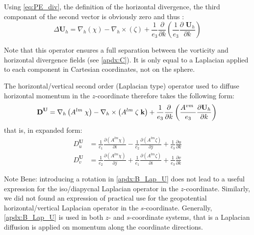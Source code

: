 \documentclass[../main/NEMO_manual]{subfiles}
\begin{document}
Using \autoref{eq:PE_div}, the definition of the horizontal divergence,
the third componant of the second vector is obviously zero and thus :
\[
  \Delta {\textbf{U}}_h = \nabla _h \left( \chi \right) - \nabla _h \times \left( \zeta \right) + \frac {1}{e_3 } \frac {\partial }{\partial k} \left( {\frac {1}{e_3 } \frac{\partial {\textbf{ U}}_h }{\partial k}} \right)
\]

Note that this operator ensures a full separation between
the vorticity and horizontal divergence fields (see \autoref{apdx:C}).
It is only equal to a Laplacian applied to each component in Cartesian coordinates, not on the sphere.

The horizontal/vertical second order (Laplacian type) operator used to diffuse horizontal momentum in
the $z$-coordinate therefore takes the following form:
\begin{equation}
  \label{apdx:B_Lap_U}
  {
    \textbf{D}}^{\textbf{U}} =
  \nabla _h \left( {A^{lm}\;\chi } \right)
  - \nabla _h \times \left( {A^{lm}\;\zeta \;{\textbf{k}}} \right)
  + \frac{1}{e_3 }\frac{\partial }{\partial k}\left( {\frac{A^{vm}\;}{e_3 }
      \frac{\partial {\rm {\bf U}}_h }{\partial k}} \right) \\
\end{equation}
that is, in expanded form:
\begin{align*}
  D^{\textbf{U}}_u
  & = \frac{1}{e_1} \frac{\partial \left( {A^{lm}\chi   } \right)}{\partial i}
    -\frac{1}{e_2} \frac{\partial \left( {A^{lm}\zeta } \right)}{\partial j}
    +\frac{1}{e_3} \frac{\partial u}{\partial k}      \\
  D^{\textbf{U}}_v
  & = \frac{1}{e_2 }\frac{\partial \left( {A^{lm}\chi   } \right)}{\partial j}
    +\frac{1}{e_1 }\frac{\partial \left( {A^{lm}\zeta } \right)}{\partial i}
    +\frac{1}{e_3} \frac{\partial v}{\partial k}
\end{align*}

Note Bene: introducing a rotation in \autoref{apdx:B_Lap_U} does not lead to
a useful expression for the iso/diapycnal Laplacian operator in the $z$-coordinate.
Similarly, we did not found an expression of practical use for
the geopotential horizontal/vertical Laplacian operator in the $s$-coordinate.
Generally, \autoref{apdx:B_Lap_U} is used in both $z$- and $s$-coordinate systems,
that is a Laplacian diffusion is applied on momentum along the coordinate directions.

\biblio

\pindex
\end{document}
